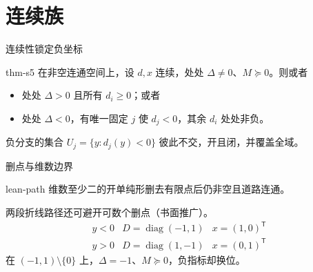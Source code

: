 \documentclass{beamer}
\begin{document}
\section{连续族}
\begin{frame}{连续性锁定负坐标}
\begin{bookresult}{thm-s5}
在非空连通空间上，设 $d,x$ 连续，处处 $\Delta\ne0$、$M\succeq0$。则或者
\begin{itemize}
\item 处处 $\Delta>0$ 且所有 $d_i\ge0$；或者
\item 处处 $\Delta{}<0$，有唯一固定 $j$ 使 $d_j\mathrel{<}0$，其余 $d_i$ 处处非负。
\end{itemize}
\end{bookresult}
负分支的集合 $U_j=\{y:d_j(y)<0\}$ 彼此不交，开且闭，并覆盖全域。
\end{frame}
\begin{frame}{删点与维数边界}
\begin{bookresult}{lean-path}
维数至少二的开单纯形删去有限点后仍非空且道路连通。
\end{bookresult}
两段折线路径还可避开可数个删点（书面推广）。
\[
\begin{array}{c|c|c}
y<0&D=\operatorname{diag}(-1,1)&x=(1,0)^{\mathsf T}\\
y>0&D=\operatorname{diag}(1,-1)&x=(0,1)^{\mathsf T}
\end{array}
\]
在 $(-1,1)\setminus\{0\}$ 上，$\Delta=-1$、$M\succeq0$，负指标却换位。
\end{frame}
\end{document}
